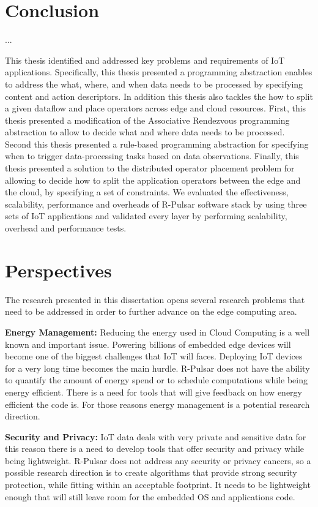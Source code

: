 \section{Conclusion}
...

This thesis identified and addressed key problems and requirements of IoT applications. Specifically, this thesis presented a programming abstraction enables to address the what, where, and when data needs to be processed by specifying content and action descriptors. In addition this thesis also tackles the how to split a given dataflow and place operators across edge and cloud resources. First, this thesis presented a modification of the Associative Rendezvous programming abstraction to allow to decide what and where data needs to be processed. Second this thesis presented a  rule-based programming abstraction for specifying when to trigger data-processing tasks based on data observations. Finally, this thesis presented a solution to the distributed operator placement problem for allowing to decide how to split the application operators between the edge and the cloud, by specifying a set of constraints. We evaluated the effectiveness, scalability, performance and overheads of R-Pulsar software stack by using three sets of IoT applications and validated every layer by performing scalability, overhead and performance tests.

\section{Perspectives}
The research presented in this dissertation opens several research problems that need to be addressed in order to further advance on the edge computing area.

\textbf{Energy Management:} Reducing the energy used in Cloud Computing is a well known and important issue. Powering billions of embedded edge devices will become one of the biggest challenges that IoT will faces. Deploying IoT devices for a very long time becomes the main hurdle. R-Pulsar does not have the ability to quantify the amount of energy spend or to schedule computations while being energy efficient. There is a need for tools that will give feedback on how energy efficient the code is. For those reasons energy management is a potential research direction. 

\textbf{Security and Privacy:} IoT data deals with very private and sensitive data for this reason there is a need to develop tools that offer security and privacy while being lightweight. R-Pulsar does not address any security or privacy cancers, so a possible research direction is to create algorithms that provide strong security protection, while fitting within an acceptable footprint. It needs to be lightweight enough that will still leave room for the embedded OS and applications code. 

